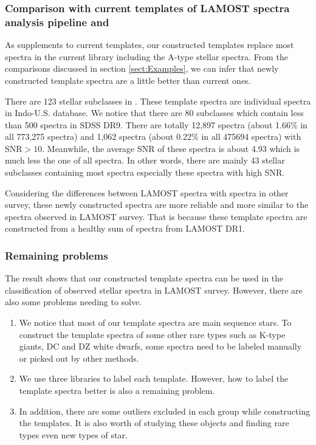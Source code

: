 \documentclass[referee]{raa}            %
\begin{document}
\subsubsection{Comparison with current templates of LAMOST spectra analysis pipeline and \citet{bolton2012spectral}}
As supplements to current templates, our constructed templates replace most spectra in the current library including the A-type stellar spectra.
From the comparisons discussed in section \ref{sect:Examples}, we can infer that newly constructed template spectra are a little better than current ones.

There are 123 stellar subclasses in \citet{bolton2012spectral}.
These template spectra  are individual spectra in  Indo-U.S. database.
We notice that there are 80 subclasses which contain less than 500 spectra in SDSS DR9.
There are totally 12,897 spectra (about 1.66\% in all 773,275 spectra) and 1,062 spectra (about 0.22\% in all 475694 spectra) with SNR$>10$.
Meanwhile, the average SNR of these spectra is about 4.93 which is much less the one of all spectra.
In other words, there are mainly 43 stellar subclasses containing most spectra especially these spectra with high SNR.


Considering the differences between LAMOST spectra with spectra in other survey,
these newly constructed spectra are more reliable and more similar to the spectra observed in LAMOST survey.
That is because these template spectra are constructed from  a healthy sum of spectra from  LAMOST DR1.

\subsubsection{Remaining problems}

The result shows that our constructed template spectra can be used in the classification of observed stellar spectra in LAMOST survey.
However, there are also some problems needing to solve.
\begin{enumerate}
\item
We notice that most of our template spectra are main sequence stars.
To construct the template spectra of some other rare types such as  K-type giants, DC and DZ white dwarfs,
some spectra  need to be labeled manually or picked out by other methods.
\item
We use three libraries to label each template.
However, how to label the template spectra better is also a remaining problem.

\item
In addition, there are some outliers excluded in each group while constructing the templates.
It is also worth of studying these objects and finding rare types even new types of star.
\end{enumerate}
\end{document}
